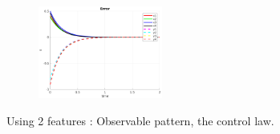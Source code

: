 \documentclass[a4paper,12pt]{article}
\begin{document}
\begin{figure}[t!]
\begin{subfigure}[b]{0.2\textwidth}
		 \end{subfigure}%
         \begin{subfigure}[b]{0.32\textwidth}
        	\centering
	        \includegraphics[height=1.2in]{../results/Demo3-error.png}
		 \end{subfigure}%
         \caption{Using 2 features : Observable pattern, the control law.}
 	\label{fig:demo3}
\end{figure}
\end{document}
